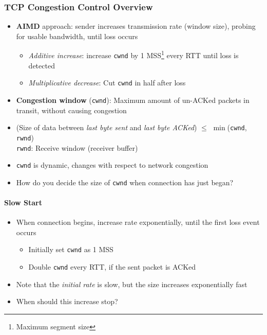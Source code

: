 \subsubsection{TCP Congestion Control Overview}
\begin{itemize}
	\item \textbf{AIMD} approach: sender increases transmission rate (window size), probing for usable bandwidth, until loss occurs
	\begin{itemize}
		\item \textit{Additive increase}: increase \texttt{cwnd} by 1 MSS\footnote{Maximum segment size} every RTT until loss is detected
		\item \textit{Multiplicative decrease}: Cut \texttt{cwnd} in half after loss
	\end{itemize}
	\item \textbf{Congestion window} (\texttt{cwnd}): Maximum amount of un-ACKed packets in transit, without causing congestion
	\item (Size of data between \textit{last byte sent} and \textit{last byte ACKed}) $\leq$ $\min$(\texttt{cwnd}, \texttt{rwnd})\\
	\texttt{rwnd}: Receive window (receiver buffer)
	\item \texttt{cwnd} is dynamic, changes with respect to network congestion
	\item How do you decide the size of \texttt{cwnd} when connection has just began?
\end{itemize}

\paragraph{Slow Start}
\begin{itemize}
	\item When connection begins, increase rate exponentially, until the first loss event occurs
	\begin{itemize}
		\item Initially set \texttt{cwnd} as 1 MSS
		\item Double \texttt{cwnd} every RTT, if the sent packet is ACKed
	\end{itemize}
	\item Note that the \textit{initial rate} is slow, but the size increases exponentially fast
	\item When should this increase stop?
\end{itemize}

